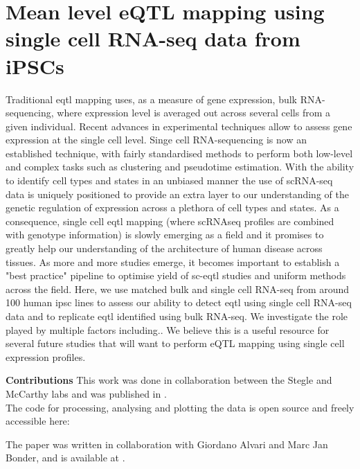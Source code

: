 
\chapter{Mean level eQTL mapping using single cell RNA-seq data from iPSCs}

Traditional \gls{eqtl} mapping uses, as a measure of gene expression, bulk RNA-sequencing, where expression level is averaged out across several cells from a given individual.
Recent advances in experimental techniques allow to assess gene expression at the single cell level.
Singe cell RNA-sequencing is now an established technique, with fairly standardised methods to perform both low-level and complex tasks such as clustering and pseudotime estimation.
With the ability to identify cell types and states in an unbiased manner the use of scRNA-seq data is uniquely positioned to provide an extra layer to our understanding of the genetic regulation of expression across a plethora of cell types and states.
As a consequence, single cell \gls{eqtl} mapping (where scRNAseq profiles are combined with genotype information) is slowly emerging as a field and it promises to greatly help our understanding of the architecture of human disease across tissues.
As more and more studies emerge, it becomes important to establish a "best practice" pipeline to optimise yield of sc-\gls{eqtl} studies and uniform methods across the field.
Here, we use matched bulk and single cell RNA-seq from around 100 human \gls{ipsc} lines to assess our ability to detect \gls{eqtl} using single cell RNA-seq data and to replicate \gls{eqtl} identified using bulk RNA-seq.
We investigate the role played by multiple factors including..
We believe this is a useful resource for several future studies that will want to perform eQTL mapping using single cell expression profiles.

\begin{Comment2}
\hspace{-3mm}\textbf{Contributions} This work was done in collaboration between the Stegle and McCarthy labs and was published in \cite{}.\\

The code for processing, analysing and plotting the data is open source and freely accessible here:

The paper was written in collaboration with Giordano Alvari and Marc Jan Bonder, and is available at .
\vfill
\end{Comment2}

